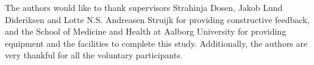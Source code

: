 \begin{multicols}{2}
	The authors would like to thank supervisors Strahinja Dosen, Jakob Lund Dideriksen and Lotte N.S. Andreasen Struijk for providing constructive feedback, and the School of Medicine and Health at Aalborg University for providing equipment and the facilities to complete this study. Additionally, the authors are very thankful for all the voluntary participants. 


\renewcommand*{\bibfont}{\footnotesize}
	\printbibliography
	
	
	
	

\end{multicols}
